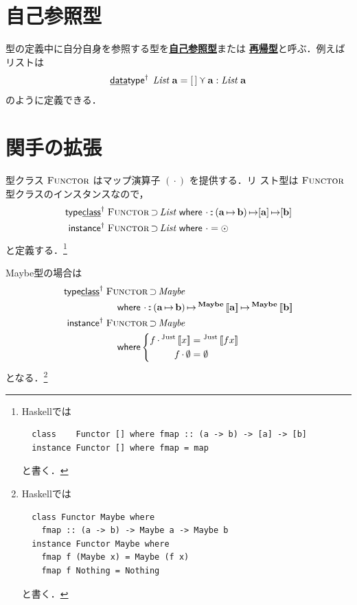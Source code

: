 \documentclass[a5paper,twoside,fleqn,draft]{jsbook}
\def\[{\left[\!\left[}
\def\]{\right]\!\right]}
\newcommand{\programminglanguage}[1]{\textsf{#1}}
\newcommand{\haskell}{\programminglanguage{Haskell}}
\newcommand{\keyword}[1]{{\underline{\textbf{#1}}}}
\newcommand{\mKeyword}[1]{\mathsf{#1}} %
\newcommand{\mKeywordUnderline}[1]{\text{\underline{\textsf{#1}}}} %
\newcommand{\mDataTypeKeyword}{\mKeywordUnderline{data}\mKeyword{type}}
\newcommand{\mInstanceKeyword}{\mKeyword{instance}}
\newcommand{\mTypeClassKeyword}{\mKeyword{type}\mKeywordUnderline{class}}
\newcommand{\mWhereKeyword}{\mKeyword{where}}
\DeclareMathOperator{\mDataTypeParametric}{\mDataTypeKeyword^\dagger}
\DeclareMathOperator{\mInstanceParametric}{\mInstanceKeyword^{\dagger}}
\DeclareMathOperator{\mSuperSet}{\supset}
\DeclareMathOperator{\mTypeClassParametric}{\mTypeClassKeyword^\dagger}
\DeclareMathOperator{\mWhere}{\mWhereKeyword}
\newcommand{\mEmptyList}{{[\,]}}
\newcommand{\mNothing}{\emptyset}
\DeclareMathOperator{\mIn}{{:\!:}}
\DeclareMathOperator{\mMap}{\cdot} %
\DeclareMathOperator{\mMapList}{\odot}
\DeclareMathOperator{\mMapsTo}{\mapsto}
\DeclareMathOperator{\mValueOr}{\curlyvee}
\newcommand{\mType}[1]{\mathbf{#1}}
\newcommand{\mListType}[1]{[\mType{#1}]}
\newcommand{\mGenericTypeAssemble}[2]{{}^{\mType{#1}}\[\mType{#2}\]}
\newcommand{\mMaybeType}[1]{\mGenericTypeAssemble{Maybe}{#1}}
\newcommand{\mTypeConstructor}[1]{\textit{#1}}
\DeclareMathOperator{\mListTypeConstructor}{\mTypeConstructor{List}}
\DeclareMathOperator{\mMaybeTypeConstructor}{\mTypeConstructor{Maybe}}
\newcommand{\mValueConstructor}[1]{\mathrm{#1}}
\newcommand{\mGenericValueAssemble}[2]{{}^\mValueConstructor{#1}\[#2\]}
\newcommand{\mJustWith}[1]{\mGenericValueAssemble{Just}{#1}}
\newcommand{\mGenericTypeClass}[1]{\textsc{#1}} %
\newcommand{\mFunctorTypeClass}{\mGenericTypeClass{Functor}}
\newcommand{\mProj}[2]{#1\mMapsTo#2}
\begin{document}
\section{自己参照型}

型の定義中に自分自身を参照する型を\keyword{自己参照型}または
\keyword{再帰型}と呼ぶ．例えばリストは
\begin{equation}
\mDataTypeParametric\;\mListTypeConstructor\,\mType{a}=\mEmptyList\mValueOr\mType{a}:\mListTypeConstructor\,\mType{a}
\end{equation}
のように定義できる．

\section{関手の拡張}

型クラス $\mFunctorTypeClass$ はマップ演算子 $(\mMap)$ を提供する．リ
スト型は $\mFunctorTypeClass$ 型クラスのインスタンスなので，
\begin{align}
  \mTypeClassParametric\;
  &\mFunctorTypeClass\mSuperSet\mListTypeConstructor{}
  \mWhere{}
  \mMap\mIn{}\mProj{(\mProj{\mType{a}}{\mType{b}})}
           {\mProj{\mListType{a}}{\mListType{b}}}\\
           \mInstanceParametric\;
           &\mFunctorTypeClass\mSuperSet\mListTypeConstructor{}
           \mWhere{}\mMap=\mMapList
\end{align}
と定義する．\footnote{\haskell では
\begin{verbatim}
  class    Functor [] where fmap :: (a -> b) -> [a] -> [b]
  instance Functor [] where fmap = map
\end{verbatim}
と書く．}

Maybe型の場合は
\begin{align}
  \mTypeClassParametric\;
  &\mFunctorTypeClass\mSuperSet\mMaybeTypeConstructor\nonumber\\
&\quad\mWhere{}\mMap\mIn{}\mProj{(\mProj{\mType{a}}{\mType{b}})}{\mProj{\mMaybeType{a}}{\mMaybeType{b}}}\\
  \mInstanceParametric\;
  &\mFunctorTypeClass\mSuperSet\mMaybeTypeConstructor\nonumber\\
  &\quad\mWhere
  \left\{
  \begin{aligned}
    f\mMap\mJustWith{x}&=\mJustWith{fx}\\
    f\mMap\mNothing&=\mNothing
  \end{aligned}
  \right.
\end{align}
となる．\footnote{\haskell では
\begin{verbatim}
  class Functor Maybe where
    fmap :: (a -> b) -> Maybe a -> Maybe b
  instance Functor Maybe where
    fmap f (Maybe x) = Maybe (f x)
    fmap f Nothing = Nothing
\end{verbatim}
と書く．}
\end{document}
